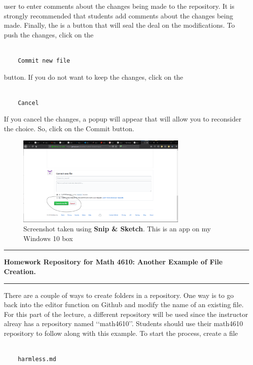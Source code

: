\documentclass[10pt,fleqn]{article}
\begin{document}
user to enter comments about the changes being made to the repository. It is
strongly recommended that students add comments about the changes being made.
Finally, the is a button that will seal the deal on the modifications. To
push the changes, click on the
\begin{verbatim}

    Commit new file

\end{verbatim}
button. If you do not want to keep the changes, click on the
\begin{verbatim}

    Cancel

\end{verbatim}
If you cancel the changes, a popup will appear that will allow you to reconsider
the choice. So, click on the Commit button.
\vfill
\begin{figure}[h]
\centering
\includegraphics[width=0.75\textwidth]{../images/github_07.png}
\caption{{Screenshot} taken using {\bf Snip \& Sketch}. This is an app on
         my Windows 10 box}
\end{figure}
\eject
\vskip0.1in\hrule\vskip0.1in
\noindent
{\bf Homework Repository for Math 4610: Another Example of File Creation.} 
\vskip0.1in\hrule\vskip0.1in
There are a couple of ways to create folders in a repository. One way is to go
back into the editor function on Github and modify the name of an existing file.
For this part of the lecture, a different repository will be used since the
instructor alreay has a repository named \lq\lq math4610\rq\rq. Students should
use their math4610 repository to follow along with this example. To start the
process, create a file
\begin{verbatim}

    harmless.md

\end{verbatim}
\end{document}
